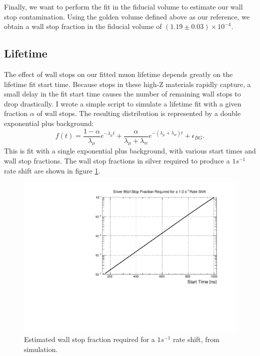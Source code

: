 Finally, we want to perform the fit in the fiducial volume to estimate our wall stop contamination.  
Using the golden volume defined above as our reference, we obtain a wall stop fraction in the fiducial volume of $(1.19 \pm 0.03) \times 10^{-4}$.

\subsection{Lifetime}

The effect of wall stops on our fitted muon lifetime depends greatly on the lifetime fit start time.  
Because stops in these high-Z materials rapidly capture, a small delay in the fit start time causes the number of remaining wall stops to drop drastically.
I wrote a simple script to simulate a lifetime fit with a given fraction $\alpha$ of wall stops.  
The resulting distribution is represented by a double exponential plus background:
\begin{equation}
f(t) = \frac{1-\alpha}{\lambda_{\mu}} e^{-\lambda_{\mu} t} + \frac{\alpha}{\lambda_{\mu}+\lambda_w} e^{-(\lambda_{\mu}+\lambda_w) t} + \epsilon_{BG}.
\end{equation}
This is fit with a single exponential plus background, with various start times and wall stop fractions.
The wall stop fractions in silver required to produce a $1 s^{-1}$ rate shift are shown in figure \ref{fig:lifetime_calib}.

\begin{figure}[h]
  \includegraphics[width=\textwidth]{neutrons/figures/lifetime_calib.pdf}
  \caption{Estimated wall stop fraction required for a $1 s^{-1}$ rate shift, from simulation.}
  \label{fig:lifetime_calib}
\end{figure}

